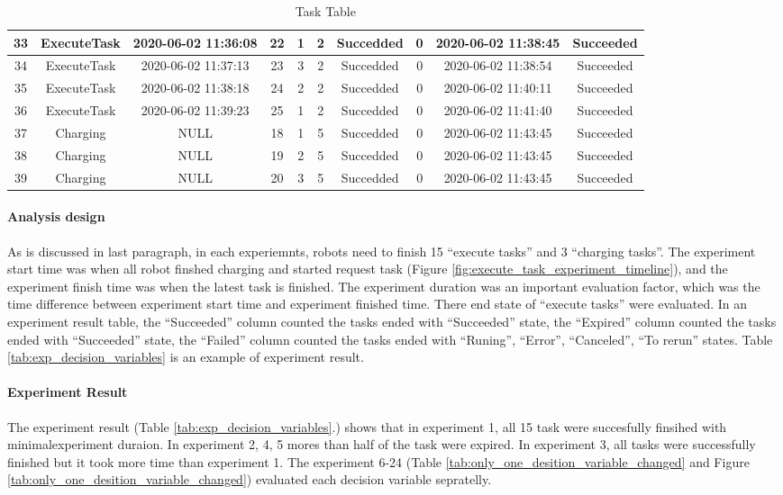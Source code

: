 \begin{table}[]
{\begin{tabular}{|c|c|c|c|c|c|c|c|c|c|}
33 & ExecuteTask & 2020-06-02 11:36:08 & 22 & 1 & 2 & Succedded & 0    & 2020-06-02 11:38:45 & Succeeded \\ \hline
34 & ExecuteTask & 2020-06-02 11:37:13 & 23 & 3 & 2 & Succedded & 0    & 2020-06-02 11:38:54 & Succeeded \\ \hline
35 & ExecuteTask & 2020-06-02 11:38:18 & 24 & 2 & 2 & Succedded & 0    & 2020-06-02 11:40:11 & Succeeded \\ \hline
36 & ExecuteTask & 2020-06-02 11:39:23 & 25 & 1 & 2 & Succedded & 0    & 2020-06-02 11:41:40 & Succeeded \\ \hline
37 & Charging    & NULL                & 18 & 1 & 5 & Succedded & 0 & 2020-06-02 11:43:45 & Succeeded \\ \hline
38 & Charging    & NULL                & 19 & 2 & 5 & Succedded & 0 & 2020-06-02 11:43:45 & Succeeded \\ \hline
39 & Charging    & NULL                & 20 & 3 & 5 & Succedded & 0 & 2020-06-02 11:43:45 & Succeeded \\ \hline
\end{tabular}}
\caption{Task Table}
\label{tab:exp_task_table}
\end{table}

\paragraph{Analysis design}
As is discussed in last paragraph, in each experiemnts, robots need to finish 15 ``execute tasks'' and 3 ``charging tasks''.
The experiment start time was when all robot finshed charging and started request task (Figure \ref{fig:execute_task_experiment_timeline}), and the experiment finish time was when the latest task is finished.
The experiment duration was an important evaluation factor, which was the time difference between experiment start time and experiment finished time.  
There end state of ``execute tasks'' were evaluated. In an experiment result table, the ``Succeeded'' column counted the tasks ended with ``Succeeded'' state, the ``Expired'' column counted the tasks ended with ``Succeeded'' state, the ``Failed'' column counted the tasks ended with ``Runing'', ``Error'', ``Canceled'', ``To rerun'' states. 
Table \ref{tab:exp_decision_variables} is an example of experiment result. 

\paragraph{Experiment Result} 
The experiment result (Table \ref{tab:exp_decision_variables}.) shows that in experiment 1, all 15 task were succesfully finsihed with minimalexperiment duraion. In experiment 2, 4, 5 mores than half of the task were expired. In experiment 3, all tasks were successfully finished but it took more time than experiment 1. 
The experiment 6-24 (Table \ref{tab:only_one_desition_variable_changed} and Figure \ref{tab:only_one_desition_variable_changed}) evaluated each decision variable sepratelly. 
